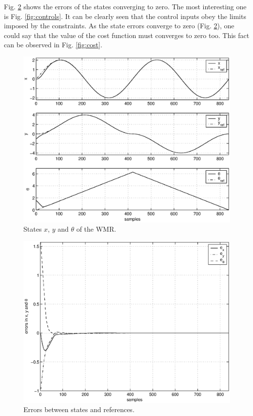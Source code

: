 \documentclass[twocolumn]{IEEEtran} %
\begin{document}
Fig. \ref{fig:errors} shows the errors of the states converging to zero. The most interesting one is Fig. \ref{fig:controls}. It can be clearly seen that the control inputs obey the limits imposed by the constraints. As the state errors converge to zero (Fig. \ref{fig:errors}), one could say that the value of the cost function must converges to zero too. This fact can be observed in Fig. \ref{fig:cost}.
\begin{figure}
	\centering
	\includegraphics[width=.99\linewidth]{Figures/states.eps}
	\caption{States $x$, $y$ and $\theta$ of the WMR.}
	\label{fig:states}
\end{figure}
\begin{figure}
	\centering
	\includegraphics[width=.99\linewidth]{Figures/errors.eps}
	\caption{Errors between states and references.}
	\label{fig:errors}
\end{figure}
\end{document}
